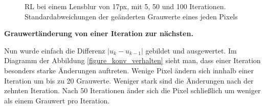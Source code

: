 \documentclass[a4paper,12pt]{article}
\begin{document}
\begin{figure}[htbp]
\caption{RL bei einem Lensblur von 17px, mit 5, 50 und 100 Iterationen.
Standardabweichungen der geänderten Grauwerte eines jeden Pixels}%
\label{figure_konv_histogramm}
\end{figure}
 
 
 
\textbf{Grauwertänderung von einer Iteration zur nächsten.}

Nun wurde einfach die Differenz $|u_k-u_{k-1}|$ gebildet und ausgewertet. Im
Diagramm der Abbildung \ref{figure_konv_verhalten} sieht man, dass einer
Iteration besonders starke Änderungen auftreten. Wenige Pixel ändern sich
innhalb einer Iteration um bis zu 20 Grauwerte. Weniger stark sind die
Änderungen nach der zehnten Iteration. Nach 50 Iterationen änder sich die Pixel
schließlich um weniger als einem Grauwert pro Iteration. 

 
\end{document}
